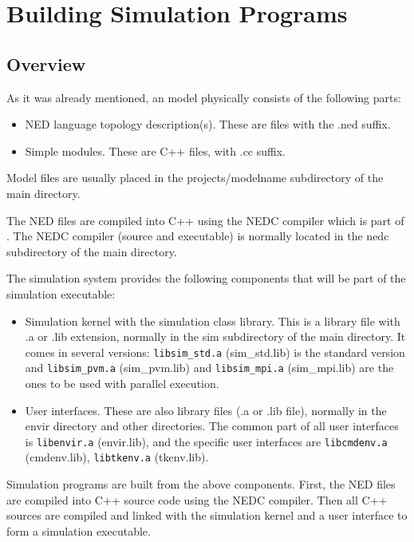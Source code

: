 \chapter{Building Simulation Programs}
\label{cha:building-simulation-programs}




\section{Overview}

As it was already mentioned, an {\opp} model physically consists of
the following parts:
\begin{itemize}
\item{NED language topology description(s). These
    are files with the .ned suffix.}
\item{Simple modules. These are C++ files, with .cc suffix.}
\end{itemize}

Model files are usually placed in the projects/modelname subdirectory 
of the main {\opp} directory.


The NED files are compiled into C++ using the NEDC
compiler which is part of {\opp}. The NEDC
compiler (source and executable) is normally located in the nedc
subdirectory of the main {\opp} directory.


The simulation system provides the following components that will be
part of the simulation executable:
\begin{itemize}
\item{Simulation kernel with the simulation
    class library. This is a library
    file with .a or .lib extension, normally in the sim subdirectory
    of the main {\opp} directory. It comes in several versions:
    \texttt{libsim\_std.a} (sim\_std.lib) is the standard version and
    \texttt{libsim\_pvm.a} (sim\_pvm.lib) and \texttt{libsim\_mpi.a}
    (sim\_mpi.lib) are the ones to be used with parallel execution.}
\item{User interfaces. These are also library files (.a or .lib file),
    normally in the envir directory and other directories. The common
    part of all user interfaces is \texttt{libenvir.a} (envir.lib),
    and the specific user interfaces are \texttt{libcmdenv.a}
    (cmdenv.lib), \texttt{libtkenv.a} (tkenv.lib).}
\end{itemize}

Simulation programs are built from the above components. First, the
NED files are compiled into C++ source code using the
NEDC compiler. Then all C++ sources are compiled
and linked with the simulation kernel and a
user interface to form a simulation executable.


